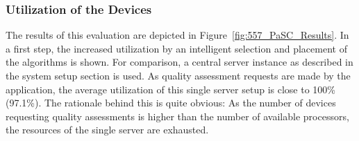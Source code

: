 \subsubsection{Utilization of the Devices}
The results of this evaluation are depicted in Figure~\ref{fig:557_PaSC_Results}.
In a first step, the increased utilization by an intelligent selection and placement of the algorithms is shown.
For comparison, a central server instance as described in the system setup section is used. 
As quality assessment requests are made by the application, the average utilization of this single server setup is close to 100\% (97.1\%). 
The rationale behind this is quite obvious: As the number of devices requesting quality assessments is higher than the number of available processors, the resources of the single server are exhausted.
\begin{figure}[!htb]
	\centering

\end{figure}
